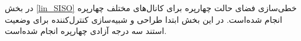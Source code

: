 \documentclass{CCI2020}
\begin{document}
	
	در بخش
	\ref{lin_SISO}
	خطی‌سازی فضای حالت چهارپره برای کانال‌های مختلف چهارپره انجام شده‌است. در این بخش ابتدا طراحی و شبیه‌سازی کنترل‌کننده برای وضعیت استند سه درجه آزادی چهارپره انجام شده‌است.
	
	
\end{document}
